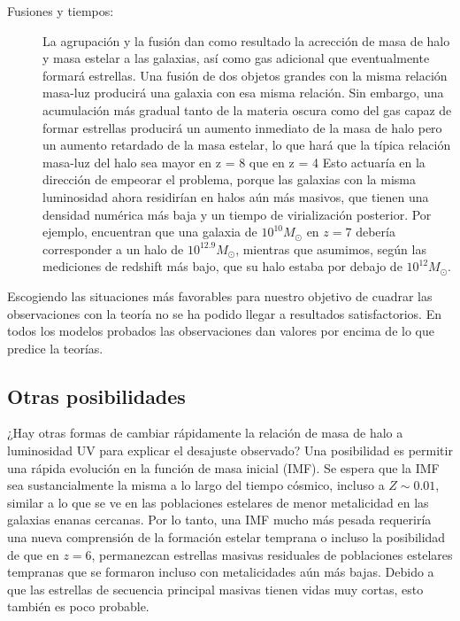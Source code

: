 \documentclass{article}
\begin{document}
\begin{description}
\item[Fusiones y tiempos:] La agrupación y la fusión dan como resultado la acrección de masa de halo y masa estelar a las galaxias, así como gas adicional que eventualmente formará estrellas. Una fusión de dos objetos grandes con la misma relación masa-luz producirá una galaxia con esa misma relación. Sin embargo, una acumulación más gradual tanto de la materia oscura como del gas capaz de formar estrellas producirá un aumento inmediato de la masa de halo pero un aumento retardado de la masa estelar, lo que hará que la típica relación masa-luz del halo sea mayor en z = 8 que en z = 4 Esto actuaría en la dirección de empeorar el problema, porque las galaxias con la misma luminosidad ahora residirían en halos aún más masivos, que tienen una densidad numérica más baja y un tiempo de virialización posterior. Por ejemplo, \cite{behroozi2015simple} encuentran que una galaxia de $10^{10}M_\odot$ en $z = 7$ debería corresponder a un halo de $10^{12.9}M_\odot$, mientras que asumimos, según las mediciones de redshift más bajo, que su halo estaba por debajo de $10^{12}M_\odot$.
\end{description}

Escogiendo las situaciones más favorables para nuestro objetivo de cuadrar las observaciones con la teoría no se ha podido llegar a resultados satisfactorios. En todos los modelos probados las observaciones dan valores por encima de lo que predice la teorías.

\subsection{Otras posibilidades}
¿Hay otras formas de cambiar rápidamente la relación de masa de halo a luminosidad UV para explicar el desajuste observado? Una posibilidad es permitir una rápida evolución en la función de masa inicial (IMF). Se espera que la IMF sea sustancialmente la misma a lo largo del tiempo cósmico, incluso a $Z\sim 0.01$, similar a lo que se ve en las poblaciones estelares de menor metalicidad en las galaxias enanas cercanas. Por lo tanto, una IMF mucho más pesada requeriría una nueva comprensión de la formación estelar temprana o incluso la posibilidad de que en $z = 6$, permanezcan estrellas masivas residuales de poblaciones estelares tempranas que se formaron incluso con metalicidades aún más bajas. Debido a que las estrellas de secuencia principal masivas tienen vidas muy cortas, esto también es poco probable.\\
\end{document}
